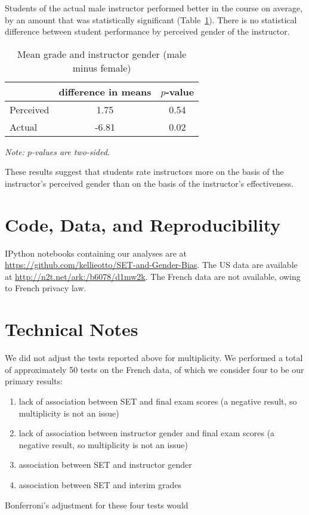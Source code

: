 \documentclass[12pt]{article}
\newcommand{\todo}[1]{{\color{red}{TO DO: \sc #1}}}
\begin{document}
Students of the actual male instructor performed better in the course on average,
by an amount that was statistically significant (Table~\ref{tab:macnell4}). 
There is no statistical difference between student performance by 
perceived gender of the instructor. 

\begin{table}[htbp]
  \centering
  \footnotesize 
  \caption{Mean grade and instructor gender (male minus female)}
    \begin{tabular}{lcc}
    \toprule 
                     & difference in means   & $p$-value    \\
   \midrule
    Perceived &         1.75       & 0.54      \\
    Actual  &            -6.81       & 0.02      \\
    \bottomrule
    \end{tabular}%
 \label{tab:macnell4}%
 
\textit{Note: $p$-values are two-sided.}
\end{table}%
\normalsize

These results suggest that students rate instructors more on the basis of the 
instructor's perceived gender than on the basis of the instructor's effectiveness. 

\section{Code, Data, and Reproducibility}
IPython notebooks containing our analyses are at
\url{https://github.com/kellieotto/SET-and-Gender-Bias}.
The US data are available at \url{http://n2t.net/ark:/b6078/d1mw2k}.
The French data are not available, owing to French privacy law.

\section{Technical Notes}
We did not adjust the tests reported above for multiplicity.
We performed a total of approximately 50 tests on the French data, of which we
consider four to be our primary results:
\begin{enumerate}
    \item lack of association between SET and final exam scores (a negative result,
               so multiplicity is not an issue)
    \item lack of association between instructor gender and final exam scores (a negative result,
               so multiplicity is not an issue)
    \item association between SET and instructor gender
    \item association between SET and interim grades
\end{enumerate}        
Bonferroni's adjustment for these four tests would \todo{fix me when the results are in}
\end{document}

